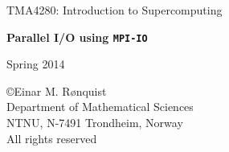 \documentclass[twoside, 11pt, a4paper]{article}
\begin{document}
\LARGE
\begin{center}
TMA4280: Introduction to Supercomputing
\end{center}
\vspace{1in}

\begin{center}
{\bf Parallel I/O using \texttt{MPI-IO}}
\end{center}

\Large
\vspace{0.5in}
\begin{center}
Spring 2014
\end{center}

\vspace{0.5in}

\begin{center}
\copyright Einar M. R{\o}nquist \\
Department of Mathematical Sciences\\
NTNU, N-7491 Trondheim, Norway\\
All rights reserved
\end{center}

\large

\newpage
\end{document}
